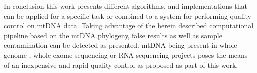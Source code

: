 In conclusion this work presents different algorithms, and implementations that can be applied for a specific task or combined to a system for performing quality control on mtDNA data. Taking advantage of the herein described computational pipeline based on the mtDNA phylogeny, false results as well as sample contamination can be detected as presented. mtDNA being present in whole genome-, whole exome sequencing or RNA-sequencing projects poses the means of an inexpensive and rapid quality control as proposed as part of this work.




